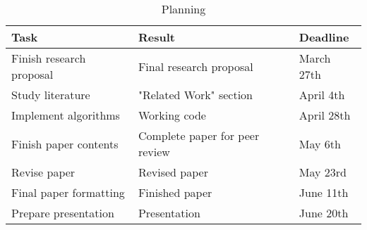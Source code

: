 \documentclass{acm_proc_article-sp}
\begin{document}
\begin{table*}
\begin{center}
\begin{tabular}{ | l | l | l | }
\hline
\textbf{Task} & \textbf{Result} & \textbf{Deadline} \\
\hline
Finish research proposal
    & Final research proposal
    & March 27th \\
Study literature
    & "Related Work" section
    & April 4th \\
Implement algorithms
    & Working code
    & April 28th \\
Finish paper contents
    & Complete paper for peer review
    & May 6th \\
Revise paper
    & Revised paper
    & May 23rd \\
Final paper formatting
    & Finished paper
    & June 11th \\
Prepare presentation
    & Presentation
    & June 20th \\
\hline
\end{tabular}
\caption{Planning}
\label{tab-planning}
\end{center}
\end{table*}



\end{document}
